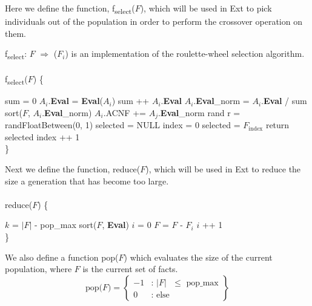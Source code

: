 \documentclass[11pt, oneside]{article}   	%
\begin{document}

\noindent Here we define the function, f\textsubscript{select}($F$), which will be used in Ext to pick individuals out of the population in order to perform the crossover operation on them.

\noindent f\textsubscript{select}: $F$ $\Rightarrow$ ($F_i$) is an implementation of the roulette-wheel selection algorithm.\\\\
f\textsubscript{select}($F$) \{
\begin{algorithmic}[\textfloatsep = 0pt]
    \STATE sum = 0
    	\STATE $A_i$.\textbf{Eval} = \textbf{Eval}($A_i$)
	\STATE sum ++ $A_i$.\textbf{Eval}
    \ENDFOR
    	\STATE $A_i$.\textbf{Eval}_norm = $A_i$.\textbf{Eval} / sum
    \ENDFOR
    \STATE sort($F$, $A_i$.\textbf{Eval}_norm)
    		\STATE $A_i$.ACNF += $A_j$.\textbf{Eval}_norm
    	\ENDFOR
    \ENDFOR
    \STATE rand r = randFloatBetween(0, 1)
    \STATE selected = NULL
    \STATE index = 0
    	\STATE selected = $F_{\text{index}}$
    		\STATE return selected
    	\ENDIF
	\STATE index ++ 1
    \ENDWHILE \\ \}
\end{algorithmic}

\noindent Next we define the function, reduce($F$), which will be used in Ext to reduce the size a generation that has become too large.\\\\
reduce($F$) \{
\begin{algorithmic}[\textfloatsep = 0pt]
    \STATE $k$ = $\vert F \vert$ - pop_max
    \STATE sort($F$, \textbf{Eval})
    \STATE $i$ = 0
    	\STATE $F$ = $F$ - $F_i$
	\STATE $i$ ++ 1
    \ENDWHILE \\ \}
\end{algorithmic}

\noindent We also define a function pop($F$) which evaluates the size of the current population, where $F$ is the current set of facts.
    \[
        \text{pop($F$)} = \left\{\begin{array}{ll}
            -1 & \text{: $\vert F \vert$ $\leq$ pop_max}\\
            0 & \text{: else}
            \end{array}\right\}
      \]
\end{document}
